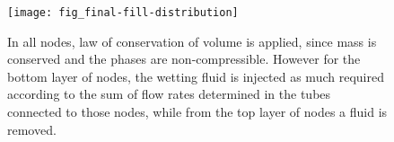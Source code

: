 	\begin{figure}[H]
		\centering
		\texttt{[image: fig\_final-fill-distribution]}
		\caption{In all nodes, law of conservation of volume is applied, since mass is conserved and the phases are non-compressible. However for the bottom layer of nodes, the wetting fluid is injected as much required according to the sum of flow rates determined in the tubes connected to those nodes, while from the top layer of nodes a fluid is removed.}
		\label{fig_plot-sat-vs-time-disp-two}
	\end{figure}
 

